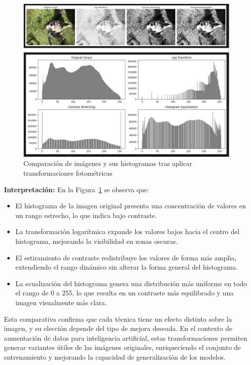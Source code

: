 \documentclass[12pt,letterpaper]{article}
\begin{document}
\begin{figure}[H]
  \centering
  \includegraphics[width=0.8\linewidth]{figuras/comparacion_transformaciones.png}
  \caption{Comparación de imágenes y sus histogramas tras aplicar transformaciones fotométricas}
  \label{fig:comparacion_transformaciones}
\end{figure}

\textbf{Interpretación:} En la Figura~\ref{fig:comparacion_transformaciones} se observa que:

\begin{itemize}
    \item El histograma de la imagen original presenta una concentración de valores en un rango estrecho, lo que indica bajo contraste.
    \item La transformación logarítmica expande los valores bajos hacia el centro del histograma, mejorando la visibilidad en zonas oscuras.
    \item El estiramiento de contraste redistribuye los valores de forma más amplia, extendiendo el rango dinámico sin alterar la forma general del histograma.
    \item La ecualización del histograma genera una distribución más uniforme en todo el rango de 0 a 255, lo que resulta en un contraste más equilibrado y una imagen visualmente más clara.
\end{itemize}

Esta comparativa confirma que cada técnica tiene un efecto distinto sobre la imagen, y su elección depende del tipo de mejora deseada. En el contexto de aumentación de datos para inteligencia artificial, estas transformaciones permiten generar variantes útiles de las imágenes originales, enriqueciendo el conjunto de entrenamiento y mejorando la capacidad de generalización de los modelos.
\end{document}
